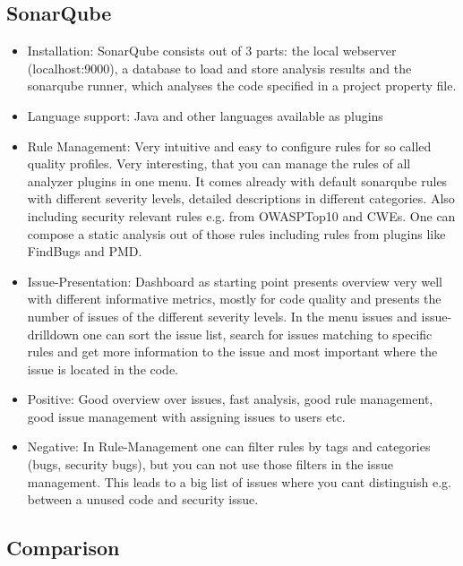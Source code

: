 \documentclass[conference]{IEEEtran}
\begin{document}
\subsection{SonarQube}
\label{subsec:evaluation_sonarqube}

\begin{itemize}
	\item Installation: SonarQube consists out of 3 parts: the local webserver (localhost:9000), a database to load and store analysis results and the sonarqube runner, which analyses the code specified in a project property file.
	
	\item Language support: Java and other languages available as plugins
	
	\item Rule Management: Very intuitive and easy to configure rules for so called quality profiles. Very interesting, that you can manage the rules of all analyzer plugins in one menu. It comes already with default sonarqube rules with different severity levels, detailed descriptions in different categories. Also including security relevant rules e.g. from OWASPTop10 and CWEs. One can compose a static analysis out of those rules including rules from plugins like FindBugs and PMD.
	
	\item Issue-Presentation: Dashboard as starting point presents overview very well with different informative metrics, mostly for code quality and presents the number of issues of the different severity levels.
	In the menu issues and issue-drilldown one can sort the issue list, search for issues matching to specific rules and get more information to the issue and most important where the issue is located in the code.
	
	\item Positive: Good overview over issues, fast analysis, good rule management, good issue management with assigning issues to users etc.
	
	\item Negative: In Rule-Management one can filter rules by tags and categories (bugs, security bugs), but you can not use those filters in the issue management. This leads to a big list of issues where you cant distinguish e.g. between a unused code and security issue.
	
\end{itemize}

\subsection{Comparison}
\label{subsec:comparation}
\end{document}
